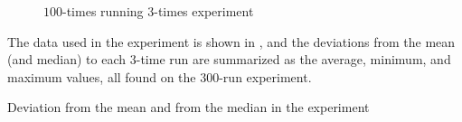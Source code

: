 \begin{figure}
  \centering
  
  \begin{minipage}[t]{\linewidth}
  \end{minipage}
  \caption{$100$-times running $3$-times experiment}
  \label{fig:CProbust}
\end{figure}

The data used in the experiment is shown in , and the deviations from the mean (and median) to each $3$-time run are summarized as the average, minimum, and maximum values, all found on the $300$-run experiment.

\begin{table}
  \centering
  \begin{tiny}
  
  \end{tiny}
  \caption{Deviation from the mean and from the median in the experiment}
  \label{tab:simStats}
\end{table}


